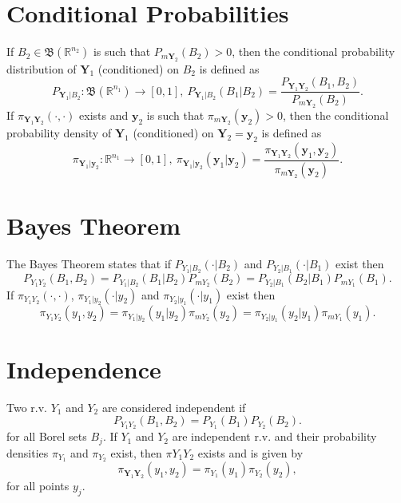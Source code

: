 \section{Conditional Probabilities}

If $B_2\in\mathfrak{B}(\mathbb{R}^{n_2})$ is such that $P_{m\mathbf{Y}_2}(B_2)>0$, then the
conditional probability distribution of $\mathbf{Y}_1$ (conditioned) on $B_2$ is defined as
\begin{equation*}
P_{\mathbf{Y}_1|B_2}:\mathfrak{B}(\mathbb{R}^{n_1})\rightarrow [0,1],~
P_{\mathbf{Y}_1|B_2}(B_1|B_2)
=
\frac
{P_{\mathbf{Y}_1\mathbf{Y}_2}(B_1,B_2)}
{P_{m\mathbf{Y}_2}(B_2)}.
\end{equation*}
%
If $\pi_{\mathbf{Y}_1\mathbf{Y}_2}(\cdot,\cdot)$ exists and $\mathbf{y}_2$ is such that $\pi_{m\mathbf{Y}_2}(\mathbf{y}_2)>0$, then the
conditional probability density of $\mathbf{Y}_1$ (conditioned) on $\mathbf{Y}_2=\mathbf{y}_2$ is defined as
\begin{equation*}
\pi_{\mathbf{Y}_1|\mathbf{y}_2}:\mathbb{R}^{n_1}\rightarrow [0,1],~
\pi_{\mathbf{Y}_1|\mathbf{y}_2}(\mathbf{y}_1|\mathbf{y}_2)
=
\frac
{\pi_{\mathbf{Y}_1\mathbf{Y}_2}(\mathbf{y}_1,\mathbf{y}_2)}
{\pi_{m\mathbf{Y}_2}(\mathbf{y}_2)}.
\end{equation*}

\section{Bayes Theorem}

The Bayes Theorem \cite{KaSo05} states that
if $P_{Y_1|B_2}(\cdot|B_2)$ and $P_{Y_2|B_1}(\cdot|B_1)$ exist then
\begin{equation}\label{eq-Bayes-1}
P_{Y_1Y_2}(B_1,B_2) = P_{Y_1|B_2}(B_1|B_2)P_{mY_2}(B_2) = P_{Y_2|B_1}(B_2|B_1)P_{mY_1}(B_1).
\end{equation}
If $\pi_{Y_1Y_2}(\cdot,\cdot)$, $\pi_{Y_1|y_2}(\cdot|y_2)$ and $\pi_{Y_2|y_1}(\cdot|y_1)$ exist then
\begin{equation}\label{eq-Bayes-2}
\pi_{Y_1Y_2}(y_1,y_2) = \pi_{Y_1|y_2}(y_1|y_2)\pi_{mY_2}(y_2) = \pi_{Y_2|y_1}(y_2|y_1)\pi_{mY_1}(y_1).
\end{equation}

\section{Independence}

Two r.v. $Y_1$ and $Y_2$ are considered independent if
\begin{equation*}
P_{Y_1Y_2}(B_1,B_2) = P_{Y_1}(B_1)P_{Y_2}(B_2).
\end{equation*}
for all Borel sets $B_j$.
If $Y_1$ and $Y_2$ are independent r.v. and
their probability densities $\pi_{Y_1}$ and $\pi_{Y_2}$ exist,
then $\pi{Y_1Y_2}$ exists and is given by
\begin{equation*}
\pi_{\mathbf{Y}_1\mathbf{Y}_2}(y_1,y_2) = \pi_{Y_1}(y_1)\pi_{Y_2}(y_2),
\end{equation*}
for all points $y_j$.

